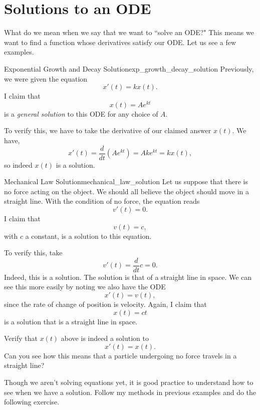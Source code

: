         \section{Solutions to an ODE}

        What do we mean when we say that we want to ``solve an ODE?" This means we want to find a function whose derivatives satisfy our ODE.  Let us see a few examples.

        \begin{ex}{Exponential Growth and Decay Solution}{exp_growth_decay_solution}
        Previously, we were given the equation
        \[
        x'(t)=kx(t).
        \]
        I claim that
        \[
        x(t)=Ae^{kt}
        \]
        is a \emph{general solution} to this ODE for any choice of $A$.

        To verify this, we have to take the derivative of our claimed answer $x(t)$. We have,
        \[
        x'(t)=\frac{d}{dt}\left(Ae^{kt}\right)=Ake^{kt}=kx(t),
        \]
        so indeed $x(t)$ is a solution.
        \end{ex}

        \begin{ex}{Mechanical Law Solution}{mechanical_law_solution}
        Let us suppose that there is no force acting on the object.  We should all believe the object should move in a straight line.  With the condition of no force, the equation reads
        \[
        v'(t)=0.
        \]
        I claim that
        \[
        v(t)=c,
        \]
        with $c$ a constant, is a solution to this equation.

        To verify this, take
        \[
        v'(t)=\frac{d}{dt} c = 0.
        \]
        Indeed, this is a solution.  The solution is that of a straight line in space.  We can see this more easily by noting we also have the ODE
        \[
        x'(t) = v(t),
        \]
        since the rate of change of position is velocity. Again, I claim that
        \[
        x(t) = ct
        \]
        is a solution that is a straight line in space.
        \end{ex}

        \begin{exercise}
        Verify that $x(t)$ above is indeed a solution to
        \[
        x'(t)=x(t).
        \]
        Can you see how this means that a particle undergoing no force travels in a straight line?
        \end{exercise}


        \noindent Though we aren't solving equations yet, it is good practice to understand how to see when we have a solution.  Follow my methods in previous examples and do the following exercise.

